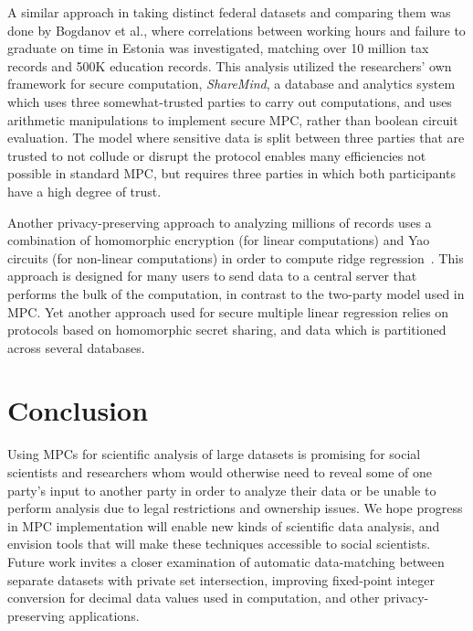 \documentclass[conference]{IEEEtran}
\begin{document}
A similar approach in taking distinct federal datasets and comparing
them was done by Bogdanov et al., where correlations between working
hours and failure to graduate on time in Estonia was investigated,
matching over 10 million tax records and 500K education
records\cite{cryptoeprint:2015:1159}.  This analysis utilized the
researchers' own framework for secure computation, \emph{ShareMind}, a
database and analytics system which uses three somewhat-trusted parties
to carry out computations, and uses arithmetic manipulations to
implement secure MPC, rather than boolean circuit
evaluation\cite{sharemind}.  The model where sensitive data is split
between three parties that are trusted to not collude or disrupt the
protocol enables many efficiencies not possible in standard MPC, but
requires three parties in which both participants have a high degree of
trust.

Another privacy-preserving approach to analyzing millions of records
uses a combination of homomorphic encryption (for linear computations)
and Yao circuits (for non-linear computations) in order to compute ridge
regression~\cite{ridgeregression}.  This approach is designed for many
users to send data to a central server that performs the bulk of the
computation, in contrast to the two-party model used in MPC. Yet another
approach used for secure multiple linear regression relies on protocols
based on homomorphic secret sharing, and data which is partitioned
across several databases\cite{secretsharing}.
 
\section{Conclusion}

Using MPCs for scientific analysis of large datasets is promising for
social scientists and researchers whom would otherwise need to reveal
some of one party's input to another party in order to analyze their
data or be unable to perform analysis due to legal restrictions and
ownership issues.  We hope progress in MPC implementation will enable
new kinds of scientific data analysis, and envision tools that will make
these techniques accessible to social scientists.  Future work invites a
closer examination of automatic data-matching between separate datasets
with private set intersection, improving fixed-point integer conversion
for decimal data values used in computation, and other
privacy-preserving applications.



\end{document}
